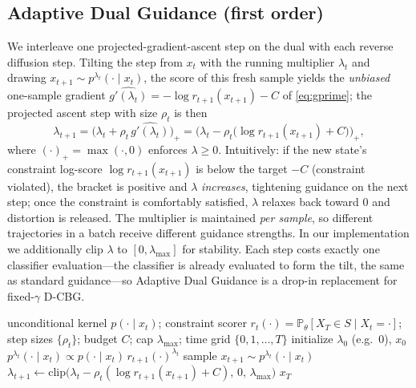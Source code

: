 \documentclass{article}
\begin{document}
\subsection{Adaptive Dual Guidance (first order)}
We interleave one projected-gradient-ascent step on the dual with each reverse diffusion step. Tilting the step from $x_t$ with the running multiplier $\lambda_t$ and drawing $x_{t+1}\sim p^{\lambda_t}(\cdot\mid x_t)$, the score of this fresh sample yields the \emph{unbiased} one-sample gradient $\widehat{g'(\lambda_t)}=-\log r_{t+1}(x_{t+1})-C$ of \eqref{eq:gprime}; the projected ascent step with size $\rho_t$ is then
\begin{equation}
\label{eq:lambda-update}
\lambda_{t+1}=\Big(\lambda_t+\rho_t\,\widehat{g'(\lambda_t)}\Big)_{+}
=\Big(\lambda_t-\rho_t\big(\log r_{t+1}(x_{t+1})+C\big)\Big)_{+},
\end{equation}
where $(\cdot)_+=\max(\cdot,0)$ enforces $\lambda\ge0$. Intuitively: if the new state's constraint log-score $\log r_{t+1}(x_{t+1})$ is below the target $-C$ (constraint violated), the bracket is positive and $\lambda$ \emph{increases}, tightening guidance on the next step; once the constraint is comfortably satisfied, $\lambda$ relaxes back toward $0$ and distortion is released. The multiplier is maintained \emph{per sample}, so different trajectories in a batch receive different guidance strengths. In our implementation we additionally clip $\lambda$ to $[0,\lambda_{\max}]$ for stability. Each step costs exactly one classifier evaluation---the classifier is already evaluated to form the tilt, the same as standard guidance---so Adaptive Dual Guidance is a drop-in replacement for fixed-$\gamma$ D-CBG.

\begin{algorithm}[t]
\caption{Adaptive Dual Guidance}
\label{alg:adg}
\begin{algorithmic}[1]
\Require unconditional kernel $p(\cdot\mid x_t)$; constraint scorer $r_t(\cdot)=\mathbb P_\theta[X_T\in S\mid X_t{=}\cdot]$; step sizes $\{\rho_t\}$; budget $C$; cap $\lambda_{\max}$; time grid $\{0,1,\dots,T\}$
\State initialize $\lambda_0$ (e.g.\ $0$), $x_0$
  \State $p^{\lambda_t}(\cdot\mid x_t)\propto p(\cdot\mid x_t)\,r_{t+1}(\cdot)^{\lambda_t}$ 
  \State sample $x_{t+1}\sim p^{\lambda_t}(\cdot\mid x_t)$
  \State $\lambda_{t+1}\gets \mathrm{clip}\big(\lambda_t-\rho_t(\log r_{t+1}(x_{t+1})+C),\,0,\,\lambda_{\max}\big)$ 
\EndFor
\State \Return $x_T$
\end{algorithmic}
\end{algorithm}
\end{document}
